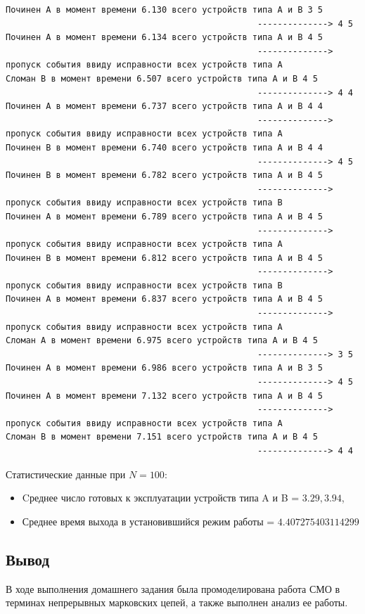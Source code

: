 \begin{verbatim}
Починен A в момент времени 6.130 всего устройств типа А и В 3 5
                                                  --------------> 4 5
Починен A в момент времени 6.134 всего устройств типа А и В 4 5
                                                  --------------> пропуск события ввиду исправности всех устройств типа А
Сломан B в момент времени 6.507 всего устройств типа А и В 4 5
                                                  --------------> 4 4
Починен A в момент времени 6.737 всего устройств типа А и В 4 4
                                                  --------------> пропуск события ввиду исправности всех устройств типа А
Починен B в момент времени 6.740 всего устройств типа А и В 4 4
                                                  --------------> 4 5
Починен B в момент времени 6.782 всего устройств типа А и В 4 5
                                                  --------------> пропуск события ввиду исправности всех устройств типа В
Починен A в момент времени 6.789 всего устройств типа А и В 4 5
                                                  --------------> пропуск события ввиду исправности всех устройств типа А
Починен B в момент времени 6.812 всего устройств типа А и В 4 5
                                                  --------------> пропуск события ввиду исправности всех устройств типа В
Починен A в момент времени 6.837 всего устройств типа А и В 4 5
                                                  --------------> пропуск события ввиду исправности всех устройств типа А
Сломан A в момент времени 6.975 всего устройств типа А и В 4 5
                                                  --------------> 3 5
Починен A в момент времени 6.986 всего устройств типа А и В 3 5
                                                  --------------> 4 5
Починен A в момент времени 7.132 всего устройств типа А и В 4 5
                                                  --------------> пропуск события ввиду исправности всех устройств типа А
Сломан B в момент времени 7.151 всего устройств типа А и В 4 5
                                                  --------------> 4 4

\end{verbatim}
\normalsize

Статистические данные при $N=100$:
\begin{itemize}
    \item Cреднее число готовых к эксплуатации устройств типа A и B = $ 3.29, 3.94 $,
    \item Среднее время выхода в установившийся режим работы = $ 4.407275403114299 $
\end{itemize}
\subsection{Вывод}
В ходе выполнения домашнего задания была промоделирована работа СМО в терминах непрерывных марковских цепей,
а также выполнен анализ ее работы.


